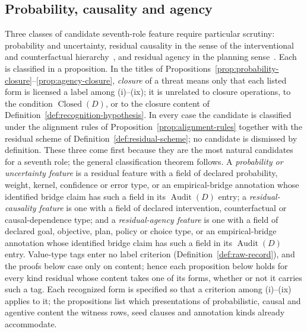 \documentclass[11pt]{article}
\theoremstyle{definition}
\newcommand{\Audit}[1]{\ensuremath{\operatorname{Audit}\!\left(#1\right)}}
\newcommand{\Closed}[1]{\ensuremath{\operatorname{Closed}\!\left(#1\right)}}
\begin{document}
\subsection{Probability, causality and agency}\label{subsec:threat-closures}

Three classes of candidate seventh-role feature require particular
scrutiny: probability and uncertainty, residual causality in the
sense of the interventional and counterfactual
hierarchy~\citep{Pearl2009}, and residual agency in the planning
sense~\citep{Bratman1987}. Each is classified in a proposition. In the titles of
Propositions~\ref{prop:probability-closure}--\ref{prop:agency-closure},
\emph{closure} of a threat means only that each listed form is licensed a label
among (i)--(ix); it is unrelated to closure operations, to the condition
\(\Closed{D}\), or to the closure content of
Definition~\ref{def:recognition-hypothesis}.
In every case the candidate is classified under the alignment rules
of Proposition~\ref{prop:alignment-rules} together with the residual
scheme of Definition~\ref{def:residual-scheme}; no candidate is
dismissed by definition. These three come first because they are the
most natural candidates for a seventh role; the general classification
theorem follows. A \emph{probability or uncertainty feature} is a residual
feature with a field of declared probability, weight, kernel, confidence or
error type, or an empirical-bridge annotation whose identified bridge claim has
such a field in its \(\Audit{D}\) entry; a \emph{residual-causality feature} is one with a field of declared
intervention, counterfactual or causal-dependence type; and a
\emph{residual-agency feature} is one with a field of declared goal,
objective, plan, policy or choice type, or an empirical-bridge annotation
whose identified bridge claim has such a field in its \(\Audit{D}\) entry.
Value-type tags enter no label criterion (Definition~\ref{def:raw-record}), and
the proofs below case only on content; hence each proposition below holds for
every kind residual whose content takes one of its forms, whether or not it
carries such a tag. Each recognized form is specified so that a criterion
among (i)--(ix) applies to it; the propositions list which presentations of
probabilistic, causal and agentive content the witness rows, seed clauses
and annotation kinds already accommodate.
\end{document}

